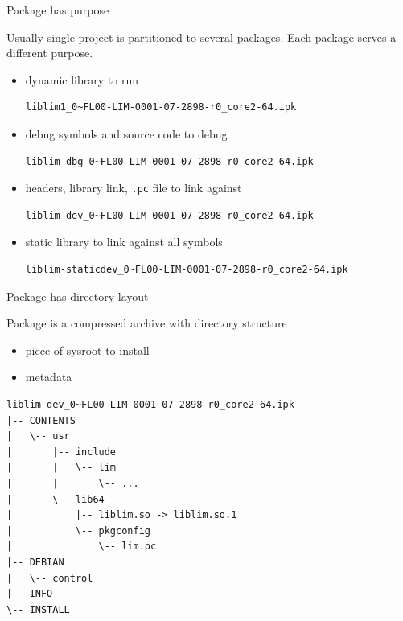 \documentclass{beamer}
\begin{document}
\begin{frame}[fragile]{Package has purpose}
    \begin{block}{}
        Usually single project is partitioned to several packages.
        Each package serves a different purpose.
    \end{block}
    \begin{itemize}
        \item{
            dynamic library \hfill to run
\begin{lstlisting}[style=Console]
liblim1_0~FL00-LIM-0001-07-2898-r0_core2-64.ipk
\end{lstlisting}
        }
        \item{
            debug symbols and source code \hfill to debug
\begin{lstlisting}[style=Console]
liblim-dbg_0~FL00-LIM-0001-07-2898-r0_core2-64.ipk
\end{lstlisting}
        }
        \item{
            headers, library link, \verb|.pc| file \hfill to link against
\begin{lstlisting}[style=Console]
liblim-dev_0~FL00-LIM-0001-07-2898-r0_core2-64.ipk
\end{lstlisting}
        }
        \item{
            static library \hfill to link against all symbols
\begin{lstlisting}[style=Console]
liblim-staticdev_0~FL00-LIM-0001-07-2898-r0_core2-64.ipk
\end{lstlisting}
        }
    \end{itemize}
\end{frame}

\begin{frame}[fragile]{Package has directory layout}
    \begin{block}{}
        Package is a compressed archive with directory structure
        \begin{itemize}
            \item{piece of sysroot to install}
            \item{metadata}
        \end{itemize}
    \end{block}
\begin{lstlisting}[style=Console]
liblim-dev_0~FL00-LIM-0001-07-2898-r0_core2-64.ipk
|-- CONTENTS
|   \-- usr
|       |-- include
|       |   \-- lim
|       |       \-- ...
|       \-- lib64
|           |-- liblim.so -> liblim.so.1
|           \-- pkgconfig
|               \-- lim.pc
|-- DEBIAN
|   \-- control
|-- INFO
\-- INSTALL
\end{lstlisting}
\end{frame}
\end{document}
